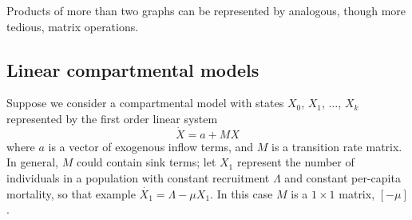 \documentclass[review]{elsarticle}
\begin{document}
Products of more than two graphs can be represented by
analogous, though more tedious, matrix operations.

\subsection{Linear compartmental models}
\label{app:markov-products}

Suppose we consider a compartmental model with states $X_0$, $X_1$, $\ldots$, $X_k$ 
represented by the first order linear system
\[
\dot{X} = a + M X
\]
where $a$ is a vector of exogenous inflow terms, and $M$ is a transition rate
matrix.  In general, $M$ could contain sink terms;
let $X_1$ represent the
number of individuals in a population with constant recruitment $\Lambda$ and
constant per-capita mortality, so that
example $\dot{X_1} = \Lambda - \mu X_1$.  In this case
$M$ is a $1 \times 1$ matrix, $[-\mu]$.
\end{document}

